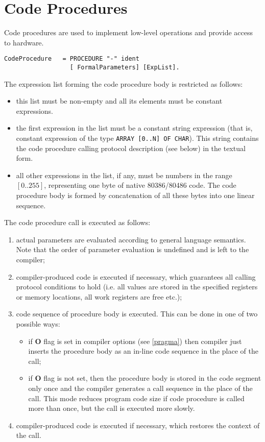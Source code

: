 \section{Code Procedures}\label{lowlevel:codeproc}

Code procedures are used to implement low-level operations
and provide access to hardware.
\begin{verbatim}
CodeProcedure   = PROCEDURE "-" ident
                  [ FormalParameters] [ExpList].
\end{verbatim}

  The expression list forming the code procedure body
is restricted as follows:
\begin{itemize}
\item
this list must be non-empty and all its elements must be constant
expressions.

\item
the first expression in the list must be a constant string expression
(that is, constant expression of the type {\tt ARRAY [0..N] OF CHAR}).
This string contains the code procedure calling protocol description
(see below) in the textual form.

\item
all other expressions in the list, if any, must be numbers in the range
$[0..255]$, representing one byte of native 80386/80486 code. The code
procedure body is formed by concatenation of all these bytes into one
linear sequence.  \end{itemize}

The code procedure call is executed as follows:
\begin{enumerate}
\item
   actual parameters are evaluated according to general language
   semantics. Note that the order of parameter evaluation is undefined and
   is left to the compiler;
\item
   compiler-produced code is executed if necessary, which guarantees all calling
   protocol conditions to hold (i.e. all values are stored in the specified
   registers or memory locations, all work registers are free etc.);
\item
   code sequence of procedure body is executed. This can be done in one
   of two possible ways:
   \begin{itemize}
   \item
     if {\bf O} flag is set in compiler options (see \ref{pragma})
     then compiler just inserts the procedure body as an in-line
    code sequence in the place of the call;
   \item
     if {\bf O} flag is not set, then the procedure body is stored in the code segment
     only once and the compiler generates a call sequence in the place of the call.
     This mode reduces program code size if code procedure is called
     more than once, but the call is executed more slowly.
   \end{itemize}
\item
   compiler-produced code is executed if necessary, which
   restores the context of the call.
\end{enumerate}

